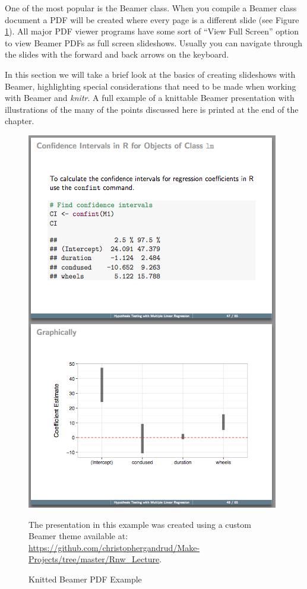 One of the most popular is the Beamer class. When you compile a Beamer class document a PDF will be created where every page is a different slide (see Figure \ref{BeamerExample}). All major PDF viewer programs have some sort of ``View Full Screen'' option to view Beamer PDFs as full screen slideshows. Usually you can navigate through the slides with the forward and back arrows on the keyboard.

In this section we will take a brief look at the basics of creating slideshows with Beamer, highlighting special considerations that need to be made when working with Beamer and \emph{knitr}. A full example of a knittable Beamer presentation with illustrations of the many of the points discussed here is printed at the end of the chapter.

\begin{figure}
    \caption{Knitted Beamer PDF Example}
    \label{BeamerExample}
        \begin{center}
            \includegraphics[scale=0.5]{Children/Chapter11/images11/BeamerExample.png}
        \end{center}
        {\scriptsize The presentation in this example was created using a custom Beamer theme available at: \url{https://github.com/christophergandrud/Make-Projects/tree/master/Rnw_Lecture}.}
\end{figure}

